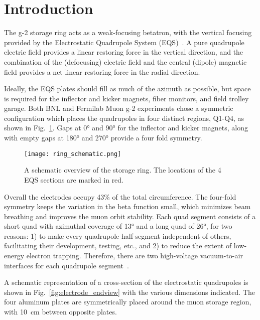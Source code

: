 \section{\label{sec:intro} Introduction}
\medskip


The g-2 storage ring acts as a weak-focusing betatron, with the vertical focusing provided by the Electrostatic Quadrupole System (EQS)~\cite{Semertzidis:2003zs}. A pure quadrupole electric field provides a linear restoring force in the vertical direction, and the combination of the (defocusing) electric field and the central (dipole) magnetic field provides a net linear restoring force in the radial direction. 

Ideally, the EQS plates should fill as much of the azimuth as possible, but space is required for the inflector and kicker magnets, fiber monitors, and field trolley garage. 
Both BNL and Fermilab Muon g-2 experiments chose a symmetric configuration which places the quadrupoles in four distinct regions, Q1-Q4, as shown in Fig.~\ref{fig:ring_schematic}.
Gaps at \ang{0} and \ang{90} for the inflector and kicker magnets, along with empty gaps at \ang{180} and \ang{270} provide a four fold symmetry. 


\begin{figure}[hb]
	\centering
	\texttt{[image: ring\_schematic.png]}
	\caption{A schematic overview of the \gmtwo storage ring. The locations of the 4 EQS sections are marked in red.}\label{fig:ring_schematic}
\end{figure}



Overall the electrodes occupy 43\% of the total circumference. The four-fold symmetry keeps the variation in the beta function small, which minimizes beam breathing and improves the muon orbit stability. Each quad segment consists of a short quad with azimuthal coverage of \ang{13} and a long quad of \ang{26}, for two reasons: 1) to make every quadrupole half-segment independent of others, facilitating their development, testing, etc., and 2) to reduce the extent of low-energy electron trapping. Therefore, there are two high-voltage vacuum-to-air interfaces for each quadrupole segment~\cite{Grange:2015fou}. 


A schematic representation of a cross-section of the electrostatic quadrupoles is shown in Fig.~\ref{fig:electrode_endview} with the various dimensions indicated. 
The four aluminum plates are symmetrically placed around the muon storage region, with \SI{10}{cm} between opposite plates. 



